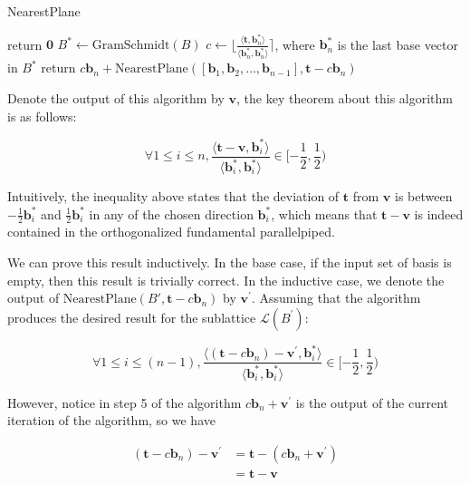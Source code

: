 \documentclass[letterpaper,12pt]{article}
\begin{document}
\begin{algorithm}
\caption{NearestPlane}
\begin{algorithmic}[1]
        \State return $\mathbf{0}$
    \EndIf 
    \State $B^\ast \leftarrow \text{GramSchmidt}(B)$
    \State $c \leftarrow \lfloor \frac{\langle\mathbf{t}, \mathbf{b}_n^\ast\rangle}{\langle\mathbf{b}_n^\ast, \mathbf{b}_n^\ast\rangle} \rceil$, where $\mathbf{b}_n^\ast$ is the last base vector in $B^\ast$
    \State return $c\mathbf{b}_n + \text{NearestPlane}([\mathbf{b}_1, \mathbf{b}_2, \ldots, \mathbf{b}_{n-1}], \mathbf{t} - c\mathbf{b}_n)$
\end{algorithmic}
\end{algorithm}


Denote the output of this algorithm by $\mathbf{v}$, the key theorem about this algorithm is as follows:

$$
\forall 1 \leq i \leq n, 
\frac{
    \langle
        \mathbf{t} - \mathbf{v}, \mathbf{b}_i^\ast
    \rangle
}{
    \langle
        \mathbf{b}_i^\ast, \mathbf{b}_i^\ast
    \rangle
} 
\in [-\frac{1}{2}, \frac{1}{2})
$$

Intuitively, the inequality above states that the deviation of $\mathbf{t}$ from $\mathbf{v}$ is between $-\frac{1}{2}\mathbf{b}_i^\ast$ and $\frac{1}{2}\mathbf{b}_i^\ast$ in any of the chosen direction $\mathbf{b}_i^\ast$, which means that $\mathbf{t} - \mathbf{v}$ is indeed contained in the orthogonalized fundamental parallelpiped.

We can prove this result inductively. In the base case, if the input set of basis is empty, then this result is trivially correct. In the inductive case, we denote the output of $\text{NearestPlane}(B', \mathbf{t} - c\mathbf{b}_n)$ by $\mathbf{v}^\prime$. Assuming that the algorithm produces the desired result for the sublattice $\mathcal{L}(B^\prime)$:

$$
\forall 1 \leq i \leq (n-1), 
\frac{
    \langle
        (\mathbf{t} - c\mathbf{b}_n) - \mathbf{v}^\prime, 
        \mathbf{b}_i^\ast
    \rangle
}{
    \langle
        \mathbf{b}_i^\ast, \mathbf{b}_i^\ast
    \rangle
} \in [-\frac{1}{2}, \frac{1}{2})
$$

However, notice in step 5 of the algorithm $c\mathbf{b}_n + \mathbf{v}^\prime$ is the output of the current iteration of the algorithm, so we have

$$
\begin{aligned}
(\mathbf{t} - c\mathbf{b}_n) - \mathbf{v}^\prime 
&= \mathbf{t} - (c\mathbf{b}_n + \mathbf{v}^\prime) \\
&= \mathbf{t} - \mathbf{v}
\end{aligned}
$$
\end{document}

